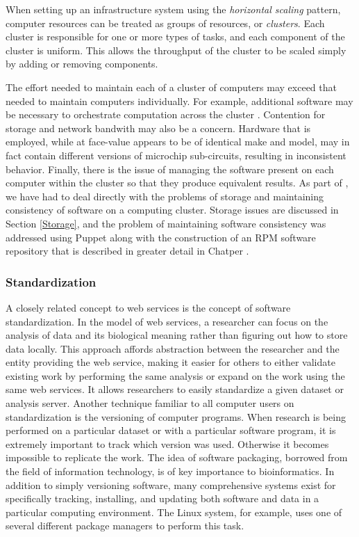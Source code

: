 When setting up an infrastructure system using the \emph{horizontal scaling}
pattern, computer resources can be treated as groups of resources, or
\emph{clusters}.  Each cluster is responsible for one or more types of tasks,
and each component of the cluster is uniform.  This allows the throughput of
the cluster to be scaled simply by adding or removing components.

The effort needed to maintain each of a cluster of computers may exceed that
needed to maintain computers individually.  For example, additional software
may be necessary to orchestrate computation across the cluster \cite{rocks}.
Contention for storage and network bandwith may also be a concern.  Hardware
that is employed, while at face-value appears to be of identical make and
model, may in fact contain different versions of microchip sub-circuits,
resulting in inconsistent behavior.  Finally, there is the issue of managing
the software present on each computer within the cluster so that they produce
equivalent results.  As part of \dbthesis, we have had to deal directly with
the problems of storage and maintaining consistency of software on a computing
cluster.  Storage issues are discussed in Section \ref{Storage}, and the
problem of maintaining software consistency was addressed using Puppet
\cite{puppet} along with the construction of an RPM \cite{rpm} software
repository that is described in greater detail in Chatper \biopackageschapter.

\subsubsection{Standardization}

A closely related concept to web services is the concept of software
standardization.  In the model of web services, a researcher can focus on the
analysis of data and its biological meaning rather than figuring out how to
store data locally.  This approach affords abstraction between the researcher
and the entity providing the web service, making it easier for others to either
validate existing work by performing the same analysis or expand on the work
using the same web services.  It allows researchers to easily standardize a
given dataset or analysis server.  Another technique familiar to all computer
users on standardization is the versioning of computer programs.  When research
is being performed on a particular dataset or with a particular software
program, it is extremely important to track which version was used.  Otherwise
it becomes impossible to replicate the work.  The idea of software packaging,
borrowed from the field of information technology, is of key importance to
bioinformatics.  In addition to simply versioning software, many comprehensive
systems exist for specifically tracking, installing, and updating both software
and data in a particular computing environment.  The Linux system, for example,
uses one of several different package managers to perform this task.

